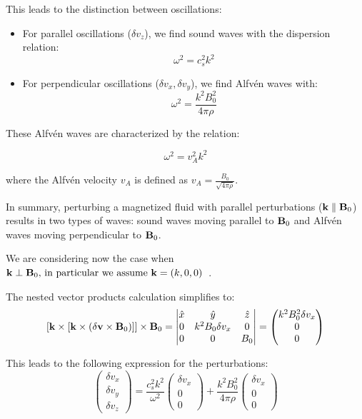 This leads to the distinction between oscillations:
%
\begin{itemize}
\item For parallel oscillations (\(\delta v_z\)), we find sound waves with the dispersion relation:
%
\begin{equation}
\omega^2 = c_s^2 k^2
\end{equation}
%
\item For perpendicular oscillations (\(\delta v_x, \delta v_y\)), we find Alfvén waves with:
\begin{equation}
\omega^2=\frac{k^2B_0^2}{4\pi \rho}
\end{equation}
\end{itemize}
%
These Alfvén waves are characterized by the relation:
%
\begin{remark}
\begin{equation}
\omega^2 = v_A^2 k^2
\end{equation}
\end{remark}
%
where the Alfvén velocity \( v_A \) is defined as \( v_A=\frac{B_0}{\sqrt{4\pi \rho}} \).

In summary, perturbing a magnetized fluid with parallel perturbations (\( \vb{k} \parallel \vb{B}_0 \)) results in two types of waves: sound waves moving parallel to \(\vb{B}_0\) and Alfvén waves moving perpendicular to \(\vb{B}_0\).

We are considering now the case when \( \vb{k} \perp \vb{B}_0$, in particular we assume \(  \vb{k}=(k,0,0) \)~.

The nested vector products calculation simplifies to:
%
\begin{equation}
\left[ \vb{k} \times \left[\vb{k} \times \left(\delta \vb{v} \times \vb{B}_0 \right) \right] \right] \times \vb{B}_0 = 
\begin{vmatrix}
\hat{x} & \hat{y} & \hat{z} \\
0 & k^2B_0 \delta v_x & 0 \\
0 & 0 & B_0
\end{vmatrix} = \begin{pmatrix}
k^2 B_0^2 \delta v_x\\
0 \\
0
\end{pmatrix}
\end{equation}

This leads to the following expression for the perturbations:
%
\begin{equation}
\begin{pmatrix}
\delta v_x\\
\delta v_y\\
\delta v_z
\end{pmatrix} = \frac{c_s^2 k^2}{\omega^2} 
\begin{pmatrix}
\delta v_x\\
0 \\
0
\end{pmatrix} 
+ \frac{k^2 B_0^2}{4\pi\rho}
\begin{pmatrix}
\delta v_x\\
0\\
0
\end{pmatrix}
\end{equation}

